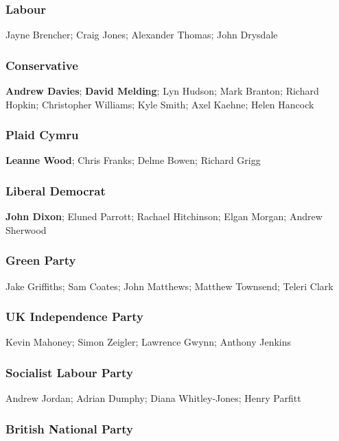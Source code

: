 \begin{resultsiii}
\subsubsection*{Labour}

Jayne Brencher; Craig Jones; Alexander Thomas; John Drysdale

\subsubsection*{Conservative}

\textbf{Andrew Davies}; \textbf{David Melding}; Lyn Hudson; Mark Branton; Richard Hopkin; Christopher Williams; Kyle Smith; Axel Kaehne; Helen Hancock

\subsubsection*{Plaid Cymru}

\textbf{Leanne Wood}; Chris Franks; Delme Bowen; Richard Grigg

\subsubsection*{Liberal Democrat}

\textbf{John Dixon}; Eluned Parrott; Rachael Hitchinson; Elgan Morgan; Andrew Sherwood

\subsubsection*{Green Party}

Jake Griffiths; Sam Coates; John Matthews; Matthew Townsend; Teleri Clark

\subsubsection*{UK Independence Party}

Kevin Mahoney; Simon Zeigler; Lawrence Gwynn; Anthony Jenkins

\subsubsection*{Socialist Labour Party}

Andrew Jordan; Adrian Dumphy; Diana Whitley-Jones; Henry Parfitt

\subsubsection*{British National Party}


\end{resultsiii}
